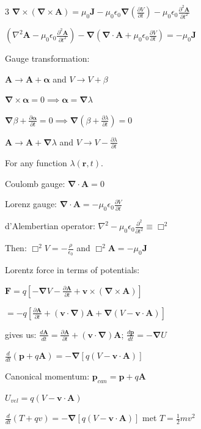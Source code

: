 \documentclass[a4paper,twoside]{article}
\begin{document}
\begin{multicols*}{3}
\(\bm \nabla \times (\bm \nabla \times \bm A)= \mu_0 \bm J - \mu_0 \epsilon_0 \bm \nabla \left(\frac{\partial V }{\partial t}\right) - \mu_0 \epsilon_0 \frac{\partial^2 \bm A}{\partial t^2}\)

\( ( \nabla^2 \bm A - \mu_0 \epsilon_0 \frac{\partial^2 \bm A}{\partial t^2} ) 
- \bm \nabla (\bm \nabla \cdot \bm A + \mu_0 \epsilon_0 \frac{\partial V}{\partial t} )
= -\mu_0 \bm J\)

Gauge transformation:

\(\bm A \to \bm A + \bm \alpha\) and \(V \to V + \beta\) 

\(\bm \nabla \times \bm\alpha = 0 \implies \bm \alpha = \bm \nabla \lambda\)

\(\bm \nabla \beta + \frac{\partial \bm \alpha}{\partial t} = 0 \implies\bm \nabla (\beta + \frac{\partial \lambda}{\partial t})=0\)

\(\bm A \to \bm A + \bm \nabla \lambda\) and \(V \to V - \frac{\partial \lambda}{\partial t}\)

For any function \(\lambda(\bm r, t)\).

Coulomb gauge: \(\bm \nabla \cdot \bm A = 0\)

Lorenz gauge: \(\bm \nabla \cdot \bm A = -\mu_0 \epsilon_0 \frac{\partial V}{\partial t} \)

d'Alembertian operator:  \(\nabla^2 -\mu_0 \epsilon_0 \frac{\partial^2}{\partial t^2} \equiv \Box^2\)

Then:
\(\Box^2 V = -\frac{\rho}{\epsilon_0}\) and \(\Box^2 \bm A = -\mu_0 \bm J\)

Lorentz force in terms of potentials:

\(\bm F = q [ -\bm \nabla V - \frac{\partial \bm A}{\partial t} + \bm v \times (\bm \nabla \times \bm A)] \)

\(= -q[\frac{\partial \bm A}{\partial t} + (\bm v \cdot \bm \nabla) \bm A + \bm \nabla (V-\bm v \cdot \bm A)]\)

gives us:
\( \frac{d \bm A}{dt} = \frac{\partial \bm A}{\partial t} + (\bm v \cdot \bm \nabla) \bm A \);
\(\frac{d\bm p}{dt} = - \bm \nabla U\)

\(\frac{d}{dt}(\bm p + q \bm A) = - \bm \nabla [q(V-\bm v \cdot \bm A)]\)

Canonical momentum:
\(\bm p_{can} = \bm p + q \bm A\)

\(U_{vel} = q(V-\bm v \cdot \bm A)\)

\(\frac{d}{dt} (T + qv) = - \bm \nabla [q(V-\bm v \cdot \bm A)]\) met \(T = \frac{1}{2}mv^2\)


\end{multicols*}
\end{document}
